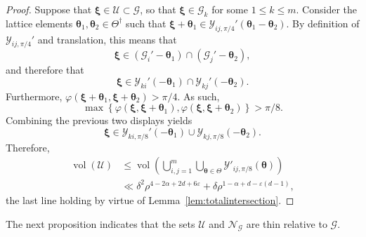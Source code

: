 \documentclass[AHL,Unicode,longabstracts,published]{cedram}
\DeclareMathOperator{\vol}{vol}
\newcommand{\CG}{\mathcal{G}}
\newcommand{\CN}{\mathcal{N}}
\newcommand{\CU}{\mathcal{U}}
\newcommand{\CY}{\mathcal{Y}}
\newcommand{\btheta}{\boldsymbol \theta}
\newcommand{\bxi}{\boldsymbol \xi}
\renewcommand{\phi}{\varphi}
\newcommand{\eps}{\varepsilon}
\newcommand{\set}[1]{\left\{ #1 \right\}}
\begin{document}
\begin{proof}
Suppose that $\bxi \in \CU \subset \CG$, so that $\bxi \in \CG_k$ for some $1 \le k \le m$. Consider the lattice elements $\btheta_1, \btheta_2 \in
\Theta^\dagger$ such that $\bxi + \btheta_1 \in \CY_{ij,\pi/4}'(\btheta_1 -
\btheta_2)$. By definition of $\CY_{ij,\pi/4}'$ and translation, this means that
\begin{equation}
\bxi \in (\CG_i' - \btheta_1) \cap (\CG_j' - \btheta_2),
\end{equation}
and therefore that
\begin{equation}
\bxi \in \CY_{ki}'(-\btheta_1) \cap \CY_{kj}'(- \btheta_2).
\end{equation}
Furthermore, $\phi(\bxi+\btheta_1,\bxi+\btheta_2) > \pi/4$. As such,
\begin{equation}
\max \set{\phi(\bxi,\bxi+\btheta_1),\phi(\bxi,\bxi+\btheta_2)} > \pi/8.
\end{equation}
Combining the previous two displays yields
\begin{equation}
\bxi \in \CY_{ki,\pi/8}'(-\btheta_1) \cup \CY_{kj,\pi/8}(-\btheta_2).
\end{equation}
Therefore,
\begin{equation}
\begin{aligned}
\vol(\CU) &\le \vol\left(\bigcup_{i,j = 1}^m \bigcup_{\btheta \in
\Theta} \CY'_{ij,\pi/8}(\btheta) \right) \\
&\ll \delta^2 \rho^{4 - 2 \alpha + 2d + 6\eps} + \delta \rho^{1 -
\alpha + d - \eps(d - 1)},
\end{aligned}
\end{equation}
the last line holding by virtue of Lemma~\ref{lem:totalintersection}.
\end{proof}

The next proposition indicates that the sets $\CU$ and $\CN_\CG$ are thin relative to $\CG$.
\end{document}
